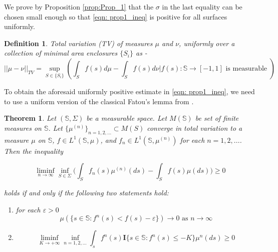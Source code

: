 \documentclass{amsart}
\newtheorem{theorem}{Theorem}
\newtheorem{definition}{Definition}
\theoremstyle{named}
\begin{document}
We prove by Proposition \ref{prop:Prop_1} that the $\sigma$ in the last equality can be chosen small enough so that \eqref{eqn: prop1_ineq} is positive for all surfaces uniformly. \\


\begin{definition}
    Total variation (TV) of measures $\mu$ and $\nu$, uniformly over a collection of minimal area enclosures $\{ S_i \}$ as  - 
    \begin{equation} \nonumber
        \nonumber
        ||\mu - \nu||_{TV} = \sup\limits_{S \in \{S_i\}} \left( \int_{S} f(s)  d\mu - \int_{S} f(s) d\nu | f(s): \mathbb{S} \rightarrow [-1,1] \text{ is measurable } \right)
    \end{equation}
\end{definition}

To obtain the aforesaid uniformly positive estimate in \eqref{eqn: prop1_ineq}, we need to use a uniform version of the classical Fatou's lemma from \cite{feinberg2015uniform}.

\begin{theorem} \label{theorem: feinberg}
    Let $(\mathbb{S}, \Sigma)$ be a measurable space. Let $M(\mathbb{S})$ be set of finite measures on $\mathbb{S}$. Let $\{ \mu^{(n)}\}_{n=1,2,...} \subset M(S)$ converge in total variation to a measure $\mu$ on $\mathbb{S}$, $f \in L^1(\mathbb{S},\mu)$, and $f_n \in L^1(\mathbb{S},\mu^{(n)})$ for each $n=1,2,...$. Then the inequality 

    \begin{equation} \nonumber 
        \liminf\limits_{n \rightarrow \infty}\inf\limits_{S \in \Sigma} \bigg( \int_S f_n(s) \mu^{(n)}(ds) - \int_S f(s) \mu(ds) \bigg) \geq 0
    \end{equation}

    holds if and only if the following two statements hold:

    \begin{enumerate}
        \item for each $\varepsilon > 0$
        \begin{equation} \nonumber 
            \mu(\{ s \in \mathbb{S}: f^n(s) < f(s) - \varepsilon \}) \rightarrow 0 \text{ as } n \rightarrow \infty
        \end{equation}
        \item
        \begin{equation} \nonumber 
            \liminf\limits_{K \rightarrow +\infty} \inf\limits_{n=1,2,...} \int_s f^n(s) \boldsymbol{I}\{ s \in \mathbb{S}: f^n(s) \leq -K \} \mu^n(ds) \geq 0
        \end{equation} 
    \end{enumerate}
    
\end{theorem}
\end{document}
